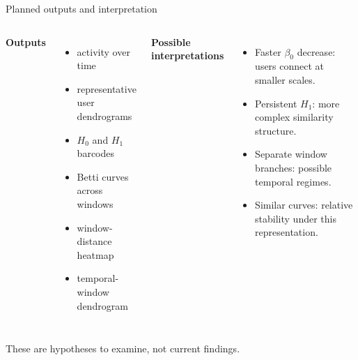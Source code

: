 \documentclass[aspectratio=169,11pt]{beamer}
\newcommand{\term}[1]{\textcolor{Ocean}{\textbf{#1}}}
\begin{document}
\begin{frame}{Planned outputs and interpretation}
  \begin{columns}[T,onlytextwidth]
      \term{Outputs}
      \begin{itemize}
        \item activity over time
        \item representative user dendrograms
        \item $H_0$ and $H_1$ barcodes
        \item Betti curves across windows
        \item window-distance heatmap
        \item temporal-window dendrogram
      \end{itemize}

      \term{Possible interpretations}
      \begin{itemize}
        \item Faster $\beta_0$ decrease: users connect at smaller scales.
        \item Persistent $H_1$: more complex similarity structure.
        \item Separate window branches: possible temporal regimes.
        \item Similar curves: relative stability under this representation.
      \end{itemize}
  \end{columns}

  \vspace{0.35cm}
  These are hypotheses to examine, not current findings.
\end{frame}
\end{document}
